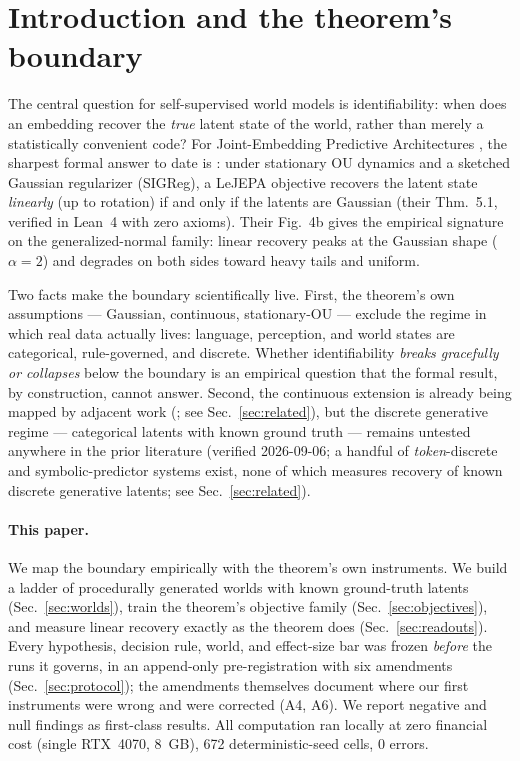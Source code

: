 \documentclass[10pt]{article}
\begin{document}
\section{Introduction and the theorem's boundary}
\label{sec:intro}
The central question for self-supervised world models is identifiability: when
does an embedding recover the \emph{true} latent state of the world, rather
than merely a statistically convenient code? For Joint-Embedding Predictive
Architectures \citep{lecun2022path,assran2023ijepa}, the sharpest formal answer
to date is \citet{klindt2026lejepa}: under stationary OU dynamics and a
sketched Gaussian regularizer (SIGReg), a LeJEPA objective recovers the latent
state \emph{linearly} (up to rotation) if and only if the latents are Gaussian
(their Thm.~5.1, verified in Lean~4 with zero axioms). Their Fig.~4b gives the
empirical signature on the generalized-normal family: linear recovery peaks at
the Gaussian shape ($\alpha=2$) and degrades on both sides toward heavy tails
and uniform.

Two facts make the boundary scientifically live. First, the theorem's own
assumptions --- Gaussian, continuous, stationary-OU --- exclude the regime in
which real data actually lives: language, perception, and world states are
categorical, rule-governed, and discrete. Whether identifiability \emph{breaks
gracefully or collapses} below the boundary is an empirical question that the
formal result, by construction, cannot answer. Second, the continuous
extension is already being mapped by adjacent work
(\citet{arya2026,controlledWM2026}; see Sec.~\ref{sec:related}), but the
discrete generative regime --- categorical latents with known ground truth ---
remains untested anywhere in the prior literature (verified 2026-09-06; a
handful of \emph{token}-discrete and symbolic-predictor systems exist, none of
which measures recovery of known discrete generative latents; see
Sec.~\ref{sec:related}).

\paragraph{This paper.}
We map the boundary empirically with the theorem's own instruments. We build a
ladder of procedurally generated worlds with known ground-truth latents
(Sec.~\ref{sec:worlds}), train the theorem's objective family
(Sec.~\ref{sec:objectives}), and measure linear recovery exactly as the theorem
does (Sec.~\ref{sec:readouts}). Every hypothesis, decision rule, world, and
effect-size bar was frozen \emph{before} the runs it governs, in an
append-only pre-registration with six amendments (Sec.~\ref{sec:protocol}); the
amendments themselves document where our first instruments were wrong and were
corrected (A4, A6). We report negative and null findings as first-class
results. All computation ran locally at zero financial cost (single RTX~4070,
8~GB), 672 deterministic-seed cells, 0 errors.
\end{document}
